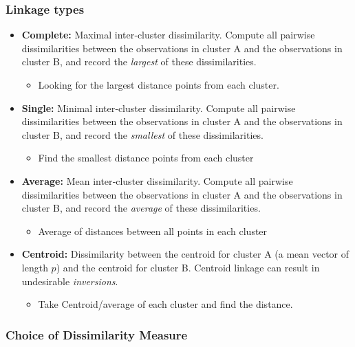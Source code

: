 \documentclass{article}
\begin{document}
\subsubsection{Linkage types}
\begin{itemize}
  \item \textbf{Complete:} Maximal inter‐cluster dissimilarity. Compute all pairwise dissimilarities between the observations in cluster A and the observations in cluster B, and record the \emph{largest} of these dissimilarities.
  \begin{itemize}
      \item Looking for the largest distance points from each cluster.
  \end{itemize}
  \item \textbf{Single:} Minimal inter‐cluster dissimilarity. Compute all pairwise dissimilarities between the observations in cluster A and the observations in cluster B, and record the \emph{smallest} of these dissimilarities.
  \begin{itemize}
      \item Find the smallest distance points from each cluster
  \end{itemize}
  \item \textbf{Average:} Mean inter‐cluster dissimilarity. Compute all pairwise dissimilarities between the observations in cluster A and the observations in cluster B, and record the \emph{average} of these dissimilarities.
  \begin{itemize}
      \item Average of distances between all points in each cluster
  \end{itemize}
  \item \textbf{Centroid:} Dissimilarity between the centroid for cluster A (a mean vector of length $p$) and the centroid for cluster B. Centroid linkage can result in undesirable \emph{inversions}.
  \begin{itemize}
      \item Take Centroid/average of each cluster and find the distance.
  \end{itemize}
\end{itemize}


\subsubsection{Choice of Dissimilarity Measure}
\end{document}
